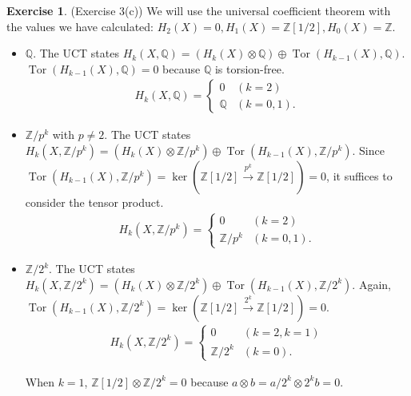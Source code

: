 \documentclass[12pt, psamsfonts]{amsart}
\theoremstyle{definition}
\newtheorem*{exer}{Exercise}
\theoremstyle{remark}
\DeclareMathOperator{\Tor}{Tor}
\numberwithin{equation}{section}
\begin{document}
\begin{exer}{(Exercise 3(c))}
  We will use the universal coefficient theorem with the values we have calculated: $H_2(X) = 0, H_1(X) = \mathbb{Z}[1/2], H_0(X) = \mathbb{Z}$.
  \begin{itemize}
    \item
      $\mathbb{Q}$.
      The UCT states $H_k(X, \mathbb{Q}) = (H_k(X) \otimes \mathbb{Q}) \oplus \Tor(H_{k - 1}(X), \mathbb{Q})$.
      $\Tor(H_{k - 1}(X), \mathbb{Q}) = 0$ because $\mathbb{Q}$ is torsion-free.
      \begin{align*}
        H_k(X, \mathbb{Q}) = \begin{cases}
          0 & (k = 2) \\
          \mathbb{Q} & (k = 0, 1).
        \end{cases}
      \end{align*}
    \item
      $\mathbb{Z}/p^k$ with $p \ne 2$.
      The UCT states $H_k(X, \mathbb{Z}/p^k) = (H_k(X) \otimes \mathbb{Z}/p^k) \oplus \Tor(H_{k - 1}(X), \mathbb{Z}/p^k)$.
      Since $\Tor(H_{k - 1}(X), \mathbb{Z}/p^k) = \ker(\mathbb{Z}[1/2] \xrightarrow{p^k} \mathbb{Z}[1/2]) = 0$, it suffices to consider the tensor product.
      \begin{align*}
        H_k(X, \mathbb{Z}/p^k) = \begin{cases}
          0 & (k = 2) \\
          \mathbb{Z}/p^k & (k = 0, 1).
        \end{cases}
      \end{align*}
    \item
      $\mathbb{Z}/2^k$.
      The UCT states $H_k(X, \mathbb{Z}/2^k) = (H_k(X) \otimes \mathbb{Z}/2^k) \oplus \Tor(H_{k - 1}(X), \mathbb{Z}/2^k)$.
      Again, $\Tor(H_{k - 1}(X), \mathbb{Z}/2^k) = \ker(\mathbb{Z}[1/2] \xrightarrow{2^k} \mathbb{Z}[1/2]) = 0$.
      \begin{align*}
        H_k(X, \mathbb{Z}/2^k) = \begin{cases}
          0 & (k = 2, k = 1) \\
          \mathbb{Z}/2^k & (k = 0).
        \end{cases}
      \end{align*}

      When $k = 1$, $\mathbb{Z}[1/2] \otimes \mathbb{Z}/2^k = 0$ because $a \otimes b = a/2^k \otimes 2^kb = 0$.
  \end{itemize}
\end{exer}
\end{document}
